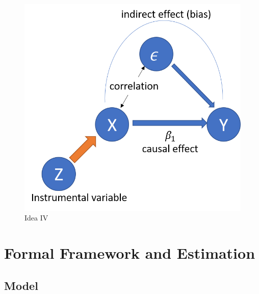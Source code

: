 \documentclass[]{book}
\begin{document}
\begin{figure}
\centering
\includegraphics{fig_IV_idea.png}
\caption{Idea IV}
\end{figure}

\section{Formal Framework and
Estimation}\label{formal-framework-and-estimation}

\subsection{Model}\label{model}
\end{document}
